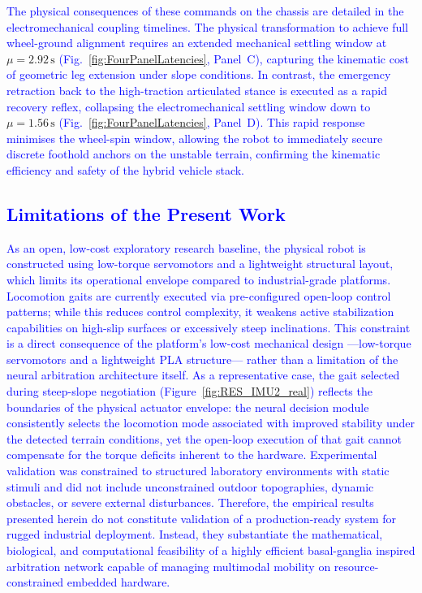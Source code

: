 \documentclass[preprint,12pt]{elsarticle}
\newcommand{\revblue}[1]{\textcolor{blue}{#1}}
\begin{document}
\revblue{The physical consequences of these commands on the chassis are detailed in the electromechanical coupling timelines. The physical transformation to achieve full wheel-ground alignment requires an extended mechanical settling window at }$\mu = 2.92\,\text{s}$\revblue{ (Fig.~}\ref{fig:FourPanelLatencies}\revblue{, Panel~C), capturing the kinematic cost of geometric leg extension under slope conditions. In contrast, the emergency retraction back to the high-traction articulated stance is executed as a rapid recovery reflex, collapsing the electromechanical settling window down to }$\mu = 1.56\,\text{s}$\revblue{ (Fig.~}\ref{fig:FourPanelLatencies}\revblue{, Panel~D). This rapid response minimises the wheel-spin window, allowing the robot to immediately secure discrete foothold anchors on the unstable terrain, confirming the kinematic efficiency and safety of the hybrid vehicle stack.}

\subsection{\revblue{Limitations of the Present Work}}
\label{ssec:Limitations}

\revblue{As an open, low-cost exploratory research baseline, the physical robot is constructed using low-torque servomotors and a lightweight structural layout, which limits its operational envelope compared to industrial-grade platforms. Locomotion gaits are currently executed via pre-configured open-loop control patterns; while this reduces control complexity, it weakens active stabilization capabilities on high-slip surfaces or excessively steep inclinations. This constraint is a direct consequence of the platform's low-cost mechanical design ---low-torque servomotors and a lightweight PLA structure--- rather than a limitation of the neural arbitration architecture itself. As a representative case, the gait selected during steep-slope negotiation (Figure~\ref{fig:RES_IMU2_real}) reflects the boundaries of the physical actuator envelope: the neural decision module consistently selects the locomotion mode associated with improved stability under the detected terrain conditions, yet the open-loop execution of that gait cannot compensate for the torque deficits inherent to the hardware. Experimental validation was constrained to structured laboratory environments with static stimuli and did not include unconstrained outdoor topographies, dynamic obstacles, or severe external disturbances. Therefore, the empirical results presented herein do not constitute validation of a production-ready system for rugged industrial deployment. Instead, they substantiate the mathematical, biological, and computational feasibility of a highly efficient basal-ganglia inspired arbitration network capable of managing multimodal mobility on resource-constrained embedded hardware.}
\end{document}
